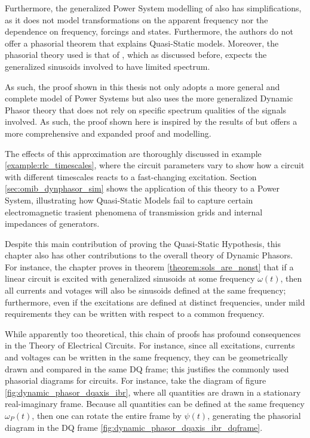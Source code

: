 	Furthermore, the generalized Power System modelling of \cite{Venkatasubramanian1995a} also has simplifications, as it does not model transformations on the apparent frequency nor the dependence on frequency, forcings and states. Furthermore, the authors do not offer a phasorial theorem that explains Quasi-Static models. Moreover, the phasorial theory used is that of \cite{Venkatasubramanian1994}, which as discussed before, expects the generalized sinusoids involved to have limited spectrum.

	As such, the proof shown in this thesis not only adopts a more general and complete model of Power Systems but also uses the more generalized Dynamic Phasor theory that does not rely on specific spectrum qualities of the signals involved. As such, the proof shown here is inspired by the results of \cite{Venkatasubramanian1995a} but offers a more comprehensive and expanded proof and modelling.

	The effects of this approximation are thoroughly discussed in example \ref{example:rlc_timescales}, where the circuit parameters vary to show how a circuit with different timescales reacts to a fast-changing excitation. Section \ref{sec:omib_dynphasor_sim} shows the application of this theory to a Power System, illustrating how Quasi-Static Models fail to capture certain electromagnetic trasient phenomena of transmission grids and internal impedances of generators.

	Despite this main contribution of proving the Quasi-Static Hypothesis, this chapter also has other contributions to the overall theory of Dynamic Phasors. For instance, the chapter proves in theorem \ref{theorem:sols_are_nonst} that if a linear circuit is excited with generalized sinusoids at some frequency $\omega(t)$, then all currents and votages will also be sinusoids defined at the same frequency; furthermore, even if the excitations are defined at distinct frequencies, under mild requirements they can be written with respect to a common frequency.

	While apparently too theoretical, this chain of proofs has profound consequences in the Theory of Electrical Circuits. For instance, since all excitations, currents and voltages can be written in the same frequency, they can be geometrically drawn and compared in the same DQ frame; this justifies the commonly used phasorial diagrams for circuits. For instance, take the diagram of figure \ref{fig:dynamic_phasor_dqaxis_ibr}, where all quantities are drawn in a stationary real-imaginary frame. Because all quantities can be defined at the same frequency $\omega_P(t)$, then one can rotate the entire frame by $\psi(t)$, generating the phasorial diagram in the DQ frame \ref{fig:dynamic_phasor_dqaxis_ibr_dqframe}.

